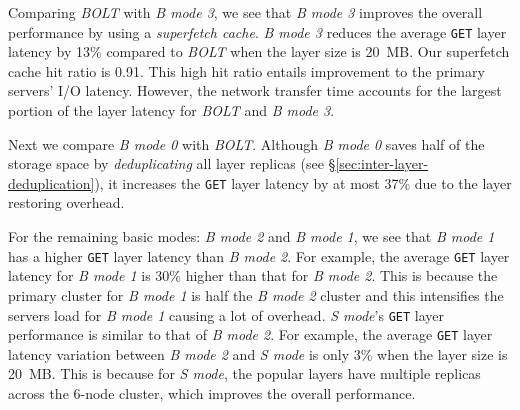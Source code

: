 Comparing \emph{BOLT} with \emph{B mode 3}, we see that \emph{B mode 3} improves the overall performance by using a \emph{superfetch cache}.
\emph{B mode 3} reduces the average \texttt{GET} layer latency by 13\% compared to \emph{BOLT} when the layer size is 20~MB.
Our superfetch cache hit ratio is 0.91. This high hit ratio entails improvement to the primary servers' I/O latency. However, the network transfer time accounts for the largest portion of the  layer latency for \emph{BOLT} and \emph{B mode 3}.

Next we compare \emph{B mode 0} with \emph{BOLT}.
Although \emph{B mode 0} saves half of the storage space by \emph{deduplicating} all layer replicas (see \S\ref{sec:inter-layer-deduplication}), it increases the \texttt{GET} layer latency by at most 37\% due to the layer restoring overhead.

For the remaining basic modes: \emph{B mode 2} and \emph{B mode 1}, we see that \emph{B mode 1} has a higher \texttt{GET} layer latency than \emph{B mode 2}.
For example, the average \texttt{GET} layer latency for \emph{B mode 1} is 30\% higher than that for \emph{B mode 2}.
This is because the primary cluster for \emph{B mode 1} is half the \emph{B mode 2} cluster and this intensifies the servers load for \emph{B mode 1} causing a lot of overhead.
\emph{S mode}'s \texttt{GET} layer performance is similar to that of \emph{B mode 2}.
For example, the average \texttt{GET} layer latency variation between \emph{B mode 2} and \emph{S mode} is only 3\% when the layer size is 20~MB.
This is because for \emph{S mode}, the popular layers have multiple replicas across the 6-node cluster, which improves the overall performance.


